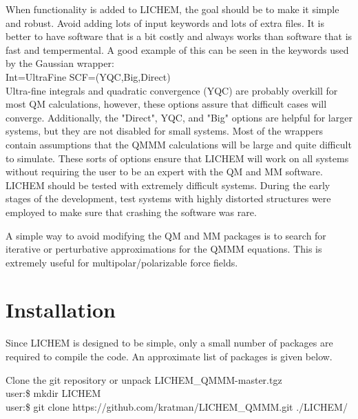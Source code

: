 \documentclass[12pt]{report}
\begin{document}
When functionality is added to LICHEM, the goal should be to make it simple and
robust. Avoid adding lots of input keywords and lots of extra files. It is
better to have software that is a bit costly and always works than software
that is fast and tempermental. A good example of this can be seen in the
keywords used by the Gaussian wrapper: \\

Int=UltraFine SCF=(YQC,Big,Direct) \\

Ultra-fine integrals and quadratic convergence (YQC) are probably overkill for
most QM calculations, however, these options assure that difficult cases will
converge. Additionally, the "Direct", YQC, and "Big" options are helpful for
larger systems, but they are not disabled for small systems. Most of the
wrappers contain assumptions that the QMMM calculations will be large and
quite difficult to simulate. These sorts of options ensure that LICHEM will
work on all systems without requiring the user to be an expert with the QM and
MM software. \\

LICHEM should be tested with extremely difficult systems. During the early
stages of the development, test systems with highly distorted structures were
employed to make sure that crashing the software was rare.

A simple way to avoid modifying the QM and MM packages is to search for
iterative or perturbative approximations for the QMMM equations. This is
extremely useful for multipolar/polarizable force fields.

\section{Installation}

Since LICHEM is designed to be simple, only a small number of packages are
required to compile the code. An approximate list of packages is given
below.
\begin{quote}
\end{quote}

Clone the git repository or unpack LICHEM\_QMMM-master.tgz \\

user:\$ mkdir LICHEM \\
user:\$ git clone https://github.com/kratman/LICHEM\_QMMM.git ./LICHEM/ \\
\end{document}
